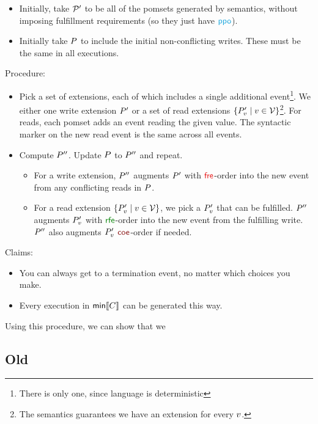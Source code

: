   \begin{itemize}
  \item Initially, take $\mathcal{P}'$ to be all of the pomsets generated by
    semantics, without imposing fulfillment requirements (so they just have
    $\rppo$).    
  \item Initially take $P$ to include the initial non-conflicting writes.
    These must be the same in all executions.
  \end{itemize}
  Procedure:
  \begin{itemize}
  \item Pick a set of extensions, each of which includes a single additional
    event\footnote{There is only one, since language is deterministic}.  We
    either one write extension $P'$ or a set of read extensions
    $\{P'_v\mid v\in\mathcal{V}\}$\footnote{The semantics guarantees we have
      an extension for every $v$.}.  For reads, each pomset adds an event
    reading the given value.  The syntactic marker on the new read event is
    the same across all events.
  \item Compute $P''$. Update $P$ to $P''$ and repeat.
    \begin{itemize}
    \item For a write extension, $P''$ augments $P'$ with $\rfre$-order
      into the new event from any conflicting reads in $P$.
    \item For a read extension $\{P'_v\mid v\in\mathcal{V}\}$, we pick a
      $P'_v$ that can be fulfilled.  $P''$ augments $P'_v$
      with $\rrfe$-order into the new event from the fulfilling write.
      $P''$ also augments $P'_v$ $\rcoe$-order if needed.
    \end{itemize}
  \end{itemize}
  Claims:
  \begin{itemize}
  \item You can always get to a termination event, no matter which choices
    you make.
  \item Every execution in $\textsf{min}\llbracket C\rrbracket$ can be generated this way.
  \end{itemize}

  Using this procedure, we can show that we 
\subsection{Old}
  
